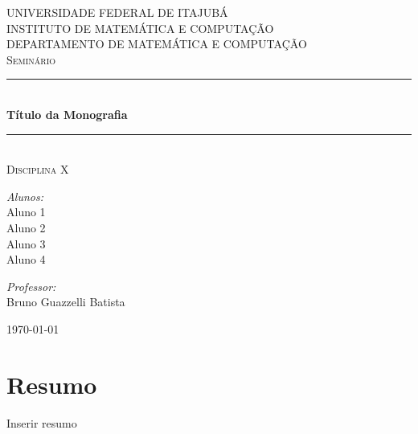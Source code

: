 \documentclass[a4paper]{article}
\newcommand{\HRule}{\rule{\linewidth}{0.5mm}}
\newcommand{\hRule}{\rule{4.5cm}{0.1mm}}
\begin{document}
\onehalfspacing

\begin{titlepage}
\begin{center}	

\textsc{\Large UNIVERSIDADE FEDERAL DE ITAJUBÁ\\
	INSTITUTO DE MATEMÁTICA E COMPUTAÇÃO}\\[0.7cm]

\textsc{DEPARTAMENTO DE MATEMÁTICA E COMPUTAÇÃO}\\[2.8cm]

\textsc{\Large Seminário}\\
\HRule \\[0.4cm]
{\Large \bfseries Título da Monografia}
\HRule \\[0.4cm]
\textsc{Disciplina X}\\[2.8cm]

\begin{minipage}{0.4\textwidth}
\begin{flushleft} \large
\emph{Alunos:}\\[0.43cm]
Aluno 1\\
Aluno 2\\
Aluno 3\\
Aluno 4\\
\end{flushleft}
\end{minipage}
\begin{minipage}{0.4\textwidth}
\begin{flushright} \large
\emph{Professor:}\\[0.4cm]
Bruno Guazzelli Batista
\end{flushright}
\end{minipage}

\vfill

\today
	
\end{center}
\end{titlepage}

\thispagestyle{empty}

\section*{Resumo}
Inserir resumo

\newpage
{}
\tableofcontents
\newpage
{}
\end{document}
